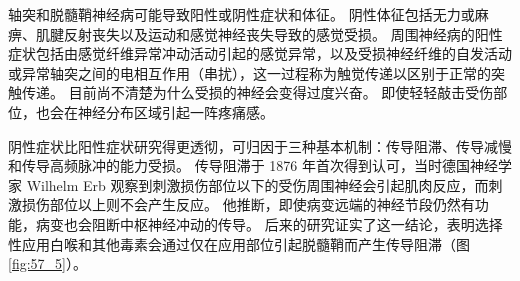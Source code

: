 轴突和脱髓鞘神经病可能导致阳性或阴性症状和体征。
阴性体征包括无力或麻痹、肌腱反射丧失以及运动和感觉神经丧失导致的感觉受损。
周围神经病的阳性症状包括由感觉纤维异常冲动活动引起的感觉异常，以及受损神经纤维的自发活动或异常轴突之间的电相互作用（串扰），这一过程称为触觉传递以区别于正常的突触传递。
目前尚不清楚为什么受损的神经会变得过度兴奋。
即使轻轻敲击受伤部位，也会在神经分布区域引起一阵疼痛感。


阴性症状比阳性症状研究得更透彻，可归因于三种基本机制：传导阻滞、传导减慢和传导高频脉冲的能力受损。
传导阻滞于 1876 年首次得到认可，当时德国神经学家 Wilhelm Erb 观察到刺激损伤部位以下的受伤周围神经会引起肌肉反应，而刺激损伤部位以上则不会产生反应。
他推断，即使病变远端的神经节段仍然有功能，病变也会阻断中枢神经冲动的传导。
后来的研究证实了这一结论，表明选择性应用白喉和其他毒素会通过仅在应用部位引起脱髓鞘而产生传导阻滞（图 \ref{fig:57_5}）。


